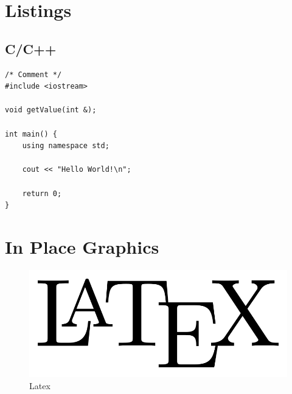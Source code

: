 \documentclass{swddoc}
\begin{document}
\tableofcontents

\section{Listings}

\subsection{C/C++}

\begin{lstlisting}[style=swd_cpp_lst_style]
/* Comment */
#include <iostream>

void getValue(int &);

int main() {
	using namespace std;

	cout << "Hello World!\n";
	
	return 0;
}
\end{lstlisting}

\section{In Place Graphics}
\begin{figure}[H]
\includegraphics[scale=0.3]{img/LaTeX-logo.png} 
\centering
\caption{Latex}
\end{figure}
\end{document}
